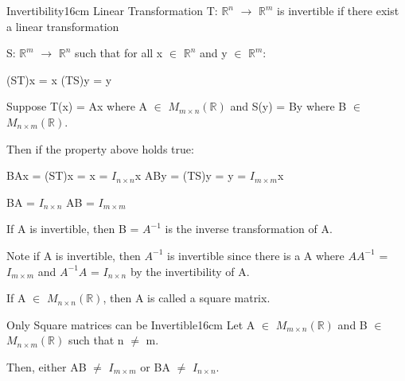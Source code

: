     \vspace{0.5cm}



    \begin{definition}{Invertibility}{16cm}
        Linear Transformation T: $\mathbb{R}^n$
        $\rightarrow$ $\mathbb{R}^m$
        is {\color{lblue} invertible} if there exist
        a linear transformation
        
        S: $\mathbb{R}^m$
        $\rightarrow$ $\mathbb{R}^n$ such that
        for all x $\in$ $\mathbb{R}^n$ and y $\in$ $\mathbb{R}^m$:

        \hspace{0.5cm}
        (ST)x = x
        \hspace{1cm}
        (TS)y = y

        Suppose T(x) = Ax where A $\in$ $M_{m \times n}(\mathbb{R})$
        and S(y) = By where B $\in$ $M_{n \times m}(\mathbb{R})$.
        
        Then if the property above holds true:

        \hspace{0.5cm}
        BAx = (ST)x = x = $I_{n \times n}$x
        \hspace{1cm}
        ABy = (TS)y = y = $I_{m \times m}$x

        \hspace{0.5cm}
        BA = $I_{n \times n}$
        \hspace{1cm}
        AB = $I_{m \times m}$

        If A is invertible, then B = $A^{-1}$ is the
        {\color{lblue} inverse transformation} of A.

        Note if A is invertible, then $A^{-1}$ is invertible
        since there is a A where $AA^{-1}$ = $I_{m \times m}$
        and $A^{-1}A$ = $I_{n \times n}$ by the invertibility of A.

        If A $\in$ $M_{n \times n}(\mathbb{R})$, then
        A is called a {\color{lblue} square matrix}.
    \end{definition}

    \newpage



    \begin{wtheorem}{Only Square matrices can be Invertible}{16cm}
        Let A $\in$ $M_{m \times n}(\mathbb{R})$
        and B $\in$ $M_{n \times m}(\mathbb{R})$
        such that n $\not =$ m.
        
        Then, either AB $\not =$ $I_{m \times m}$
        or BA $\not =$ $I_{n \times n}$.
    \end{wtheorem}


